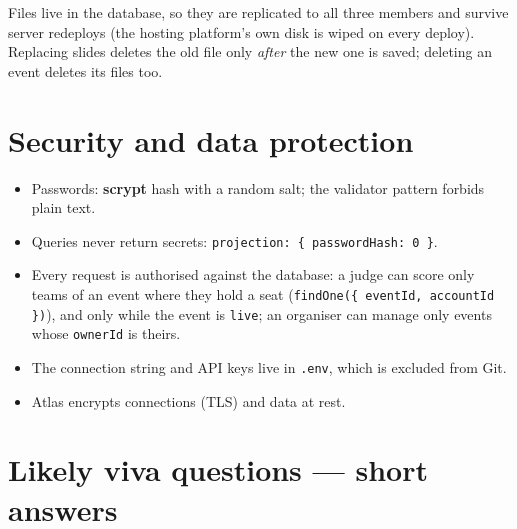 \documentclass[11pt,a4paper]{article}
\begin{document}
Files live in the database, so they are replicated to all three members and survive server redeploys (the hosting
platform's own disk is wiped on every deploy). Replacing slides deletes the old file only \emph{after} the new one is
saved; deleting an event deletes its files too.

\section{Security and data protection}
\begin{itemize}[leftmargin=1.4em]
  \item Passwords: \textbf{scrypt} hash with a random salt; the validator pattern forbids plain text.
  \item Queries never return secrets: \texttt{projection: \{ passwordHash: 0 \}}.
  \item Every request is authorised against the database: a judge can score only teams of an event where they hold a
        seat (\texttt{findOne(\{ eventId, accountId \})}), and only while the event is \texttt{live}; an organiser can
        manage only events whose \texttt{ownerId} is theirs.
  \item The connection string and API keys live in \texttt{.env}, which is excluded from Git.
  \item Atlas encrypts connections (TLS) and data at rest.
\end{itemize}

\section{Likely viva questions --- short answers}
\end{document}
